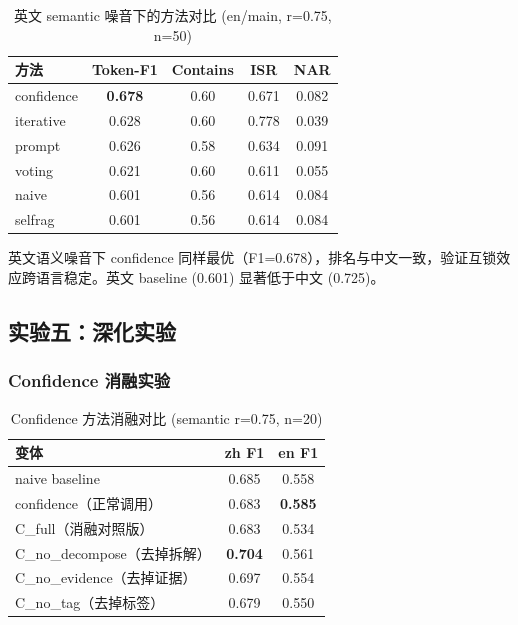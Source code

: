 \documentclass[UTF8,zihao=-4]{ctexart}
\begin{document}
\begin{table}[H]
  \centering
  \caption{英文 semantic 噪音下的方法对比 (en/main, r=0.75, n=50)}
  \begin{tabular}{lcccc}
    \toprule
    方法 & Token-F1 & Contains & ISR & NAR \\
    \midrule
    confidence & \textbf{0.678} & 0.60 & 0.671 & 0.082 \\
    iterative & 0.628 & 0.60 & 0.778 & 0.039 \\
    prompt & 0.626 & 0.58 & 0.634 & 0.091 \\
    voting & 0.621 & 0.60 & 0.611 & 0.055 \\
    naive & 0.601 & 0.56 & 0.614 & 0.084 \\
    selfrag & 0.601 & 0.56 & 0.614 & 0.084 \\
    \bottomrule
  \end{tabular}
\end{table}

英文语义噪音下 confidence 同样最优（F1=0.678），排名与中文一致，验证互锁效应跨语言稳定。英文 baseline (0.601) 显著低于中文 (0.725)。

\subsection{实验五：深化实验}

\subsubsection{Confidence 消融实验}

\begin{table}[H]
  \centering
  \caption{Confidence 方法消融对比 (semantic r=0.75, n=20)}
  \begin{tabular}{lcc}
    \toprule
    变体 & zh F1 & en F1 \\
    \midrule
    naive baseline & 0.685 & 0.558 \\
    \midrule
    confidence（正常调用） & 0.683 & \textbf{0.585} \\
    C\_full（消融对照版） & 0.683 & 0.534 \\
    C\_no\_decompose（去掉拆解） & \textbf{0.704} & 0.561 \\
    C\_no\_evidence（去掉证据）& 0.697 & 0.554 \\
    C\_no\_tag（去掉标签）& 0.679 & 0.550 \\
    \bottomrule
  \end{tabular}
\end{table}
\end{document}
